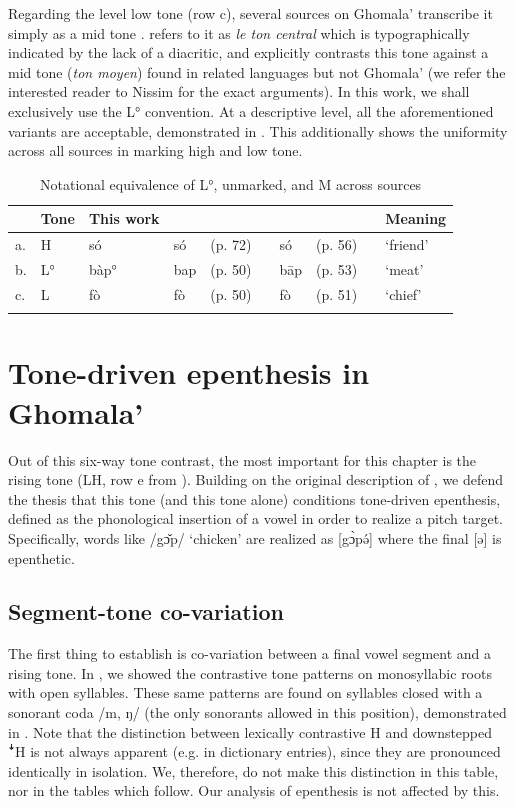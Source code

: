 \documentclass[output=paper,colorlinks,citecolor=brown,draft,draftmode]{langscibook}
\begin{document}
Regarding the level low tone (row c),
several sources on Ghomala' transcribe it simply as a mid tone \citep{bomda2005,bessala2017,kamdem2020,moguo2021}.
\citet[72]{nissim1981} refers to it as \textit{le ton central} which is typographically indicated by the lack of a diacritic, and explicitly contrasts this tone against a mid tone (\textit{ton moyen}) found in related languages but not Ghomala' (we refer the interested reader to Nissim for the exact arguments).
In this work, we shall exclusively use the L°{} convention.
At a descriptive level, all the aforementioned variants are acceptable, demonstrated in .
This additionally shows the uniformity across all sources in marking high and low tone.

\begin{table}
\caption{Notational equivalence of L°{}, unmarked, and M across sources}
\label{tab:mid}
 \begin{tabularx}{\textwidth}{lllllllXXl}
  \lsptoprule
 &Tone& This work& \multicolumn{2}{l}{\citealt{nissim1981}} & & \multicolumn{2}{l}{\citealt{bomda2005}} & &Meaning \\
  \midrule
a. &H& s\'{o}&  s\'{o}&(p. 72)&&s\'{o}&(p. 56) && `friend' \\
b.&L°{} & bàp°& bap&(p. 50)& & bāp&(p. 53)& & `meat' \\
c. &L& f\`{o}&  f\`{o}&(p. 50)&&f\`{o}&(p. 51) && `chief' \\
  \lspbottomrule
 \end{tabularx}
\end{table}


\section{Tone-driven epenthesis in Ghomala'}\label{sec:epenthesis}
Out of this six-way tone contrast, the most important for this chapter is the rising tone (LH, row e from ).
Building on the original description of \citet{nissim1981}, we defend the thesis  that this tone (and this tone alone) conditions tone-driven epenthesis,  defined as the phonological insertion of a vowel in order to realize a pitch target. 
Specifically, words like /g\v{ɔ}p/ `chicken' are realized as [g\`ɔp\'ə]  where the final [ə] is epenthetic.

\subsection{Segment-tone co-variation}
The first thing to establish is co-variation between a final vowel segment and a rising tone. 
In , we showed the contrastive tone patterns on monosyllabic roots with open syllables.
These same patterns are found on syllables closed with a sonorant coda /m, ŋ/ (the only sonorants allowed in this position), demonstrated in .
Note that the distinction between lexically contrastive H and downstepped ꜜH is not always apparent (e.g. in dictionary entries), since they are pronounced identically in isolation.
We, therefore, do not make this distinction in this table, nor in the tables which follow.
Our analysis of epenthesis is not affected by this.
\end{document}
